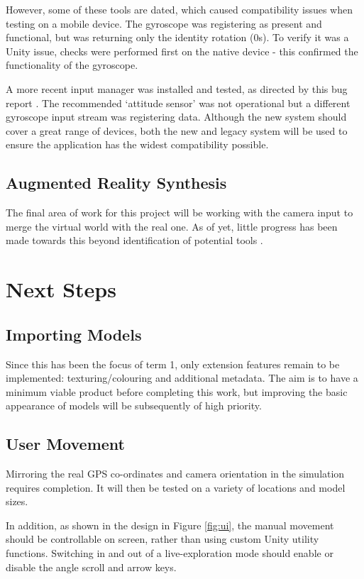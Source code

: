 \documentclass{article}
\begin{document}
However, some of these tools are dated, which caused compatibility issues when testing on a mobile device. The gyroscope was registering as present and functional, but was returning only the identity rotation (0s). To verify it was a Unity issue, checks were performed first on the native device - this confirmed the functionality of the gyroscope. 

A more recent input manager was installed and tested, as directed by this bug report \cite{gyroissue}. The recommended `attitude sensor' was not operational but a different gyroscope input stream was registering data. Although the new system should cover a great range of devices, both the new and legacy system will be used to ensure the application has the widest compatibility possible.

\subsection{Augmented Reality Synthesis}
The final area of work for this project will be working with the camera input to merge the virtual world with the real one. As of yet, little progress has been made towards this beyond identification of potential tools \cite{unityar}.

\section{Next Steps}
\subsection{Importing Models}
Since this has been the focus of term 1, only extension features remain to be implemented: texturing/colouring and additional metadata. The aim is to have a minimum viable product before completing this work, but improving the basic appearance of models will be subsequently of high priority. 

\subsection{User Movement}
Mirroring the real GPS co-ordinates and camera orientation in the simulation requires completion. It will then be tested on a variety of locations and model sizes. 

In addition, as shown in the design in Figure \ref{fig:ui}, the manual movement should be controllable on screen, rather than using custom Unity utility functions. Switching in and out of a live-exploration mode should enable or disable the angle scroll and arrow keys. 
\end{document}
